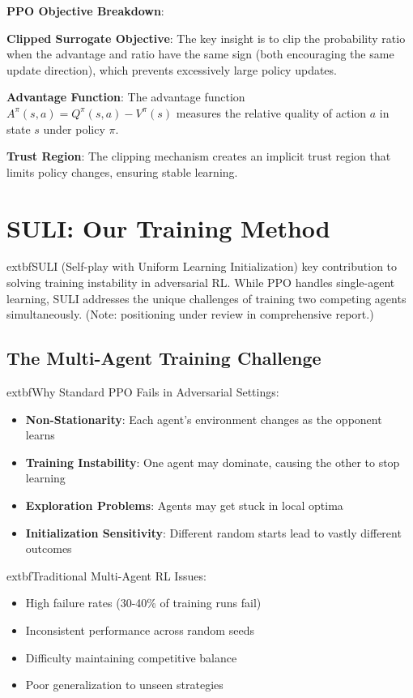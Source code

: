\documentclass[11pt]{article}
\begin{document}
\begin{mathdetails}
\textbf{PPO Objective Breakdown}:

\textbf{Clipped Surrogate Objective}: The key insight is to clip the probability ratio when the advantage and ratio have the same sign (both encouraging the same update direction), which prevents excessively large policy updates.

\textbf{Advantage Function}: The advantage function $A^{\pi}(s,a) = Q^{\pi}(s,a) - V^{\pi}(s)$ measures the relative quality of action $a$ in state $s$ under policy $\pi$.

\textbf{Trust Region}: The clipping mechanism creates an implicit trust region that limits policy changes, ensuring stable learning.
\end{mathdetails}

\section{SULI: Our Training Method}

\begin{foundation}
	extbf{SULI (Self-play with Uniform Learning Initialization)} key contribution to solving training instability in adversarial RL. While PPO handles single-agent learning, SULI addresses the unique challenges of training two competing agents simultaneously. (Note: positioning under review in comprehensive report.)
\end{foundation}

\subsection{The Multi-Agent Training Challenge}

\begin{mathdetails}
	extbf{Why Standard PPO Fails in Adversarial Settings}:
\begin{itemize}
\item \textbf{Non-Stationarity}: Each agent's environment changes as the opponent learns
\item \textbf{Training Instability}: One agent may dominate, causing the other to stop learning
\item \textbf{Exploration Problems}: Agents may get stuck in local optima
\item \textbf{Initialization Sensitivity}: Different random starts lead to vastly different outcomes
\end{itemize}

	extbf{Traditional Multi-Agent RL Issues}:
\begin{itemize}
\item High failure rates (30-40\% of training runs fail)
\item Inconsistent performance across random seeds  
\item Difficulty maintaining competitive balance
\item Poor generalization to unseen strategies
\end{itemize}
\end{mathdetails}
\end{document}
